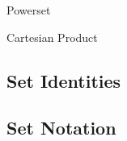 \documentclass[12pt]{article}
\begin{document}
\begin{definition}{Powerset}
  
\end{definition}

\begin{definition}{Cartesian Product}
  
\end{definition}

\subsection{Set Identities}
\label{ssec:setIdentities}

\subsection{Set Notation}
\label{ssec:setNotation}
\end{document}
